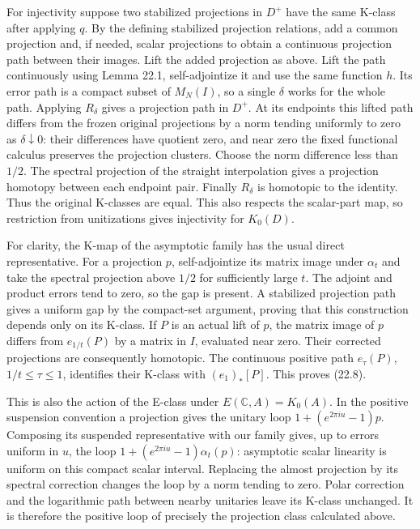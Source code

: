 \documentclass[
  11pt,
]{article}
\begin{document}
For injectivity suppose two stabilized projections in \(D^+\) have the
same K-class after applying \(q\). By the defining stabilized projection
relations, add a common projection and, if needed, scalar projections to
obtain a continuous projection path between their images. Lift the added
projection as above. Lift the path continuously using Lemma 22.1,
self-adjointize it and use the same function \(h\). Its error path is a
compact subset of \(M_N(I)\), so a single \(\delta\) works for the whole
path. Applying \(R_\delta\) gives a projection path in \(D^+\). At its
endpoints this lifted path differs from the frozen original projections
by a norm tending uniformly to zero as \(\delta\downarrow0\): their
differences have quotient zero, and near zero the fixed functional
calculus preserves the projection clusters. Choose the norm difference
less than \(1/2\). The spectral projection of the straight interpolation
gives a projection homotopy between each endpoint pair. Finally
\(R_\delta\) is homotopic to the identity. Thus the original K-classes
are equal. This also respects the scalar-part map, so restriction from
unitizations gives injectivity for \(K_0(D)\).

For clarity, the K-map of the asymptotic family has the usual direct
representative. For a projection \(p\), self-adjointize its matrix image
under \(\alpha_t\) and take the spectral projection above \(1/2\) for
sufficiently large \(t\). The adjoint and product errors tend to zero,
so the gap is present. A stabilized projection path gives a uniform gap
by the compact-set argument, proving that this construction depends only
on its K-class. If \(P\) is an actual lift of \(p\), the matrix image of
\(p\) differs from \(e_{1/t}(P)\) by a matrix in \(I\), evaluated near
zero. Their corrected projections are consequently homotopic. The
continuous positive path \(e_\tau(P)\), \(1/t\leq\tau\leq1\), identifies
their K-class with \((e_1)_*[P]\). This proves (22.8).

This is also the action of the E-class under \(E(\mathbb C,A)=K_0(A)\).
In the positive suspension convention a projection gives the unitary
loop \(1+(e^{2\pi iu}-1)p\). Composing its suspended representative with
our family gives, up to errors uniform in \(u\), the loop
\(1+(e^{2\pi iu}-1)\alpha_t(p)\): asymptotic scalar linearity is uniform
on this compact scalar interval. Replacing the almost projection by its
spectral correction changes the loop by a norm tending to zero. Polar
correction and the logarithmic path between nearby unitaries leave its
K-class unchanged. It is therefore the positive loop of precisely the
projection class calculated above.
\end{document}
